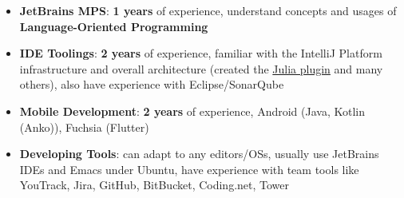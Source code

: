\documentclass{resume}
\begin{document}
{\begin{itemize}[parsep=0.25ex]
  \item \textbf{JetBrains MPS}:
    \textbf{1 years} of experience,
    understand concepts and usages of \textbf{Language-Oriented Programming}

  \item \textbf{IDE Toolings}:
    \textbf{2 years} of experience,
    familiar with the IntelliJ Platform infrastructure and overall
    architecture (created the
    \href{https://plugins.jetbrains.com/plugin/10413-julia}
         {Julia plugin} and many others), also have experience with Eclipse/SonarQube

  \item \textbf{Mobile Development}:
    \textbf{2 years} of experience,
    Android (Java, Kotlin (Anko)), Fuchsia (Flutter)

  \item \textbf{Developing Tools}:
    can adapt to any editors/OSs, usually use JetBrains IDEs and Emacs under Ubuntu,
    have experience with team tools like YouTrack, Jira, GitHub, BitBucket, Coding.net, Tower
\end{itemize}


}
\end{document}

